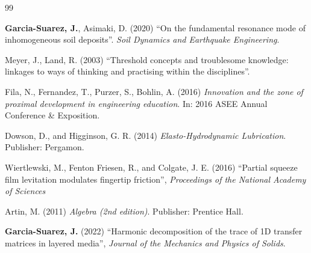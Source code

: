 \documentclass[11pt]{amsart}
\begin{document}
\begingroup
\renewcommand{\section}[2]{}%
\begin{thebibliography}{99}

	\newblock \textbf{Garcia-Suarez, J.}, Asimaki, D. (2020)
	\newblock ``On the fundamental resonance mode of inhomogeneous soil deposits''.
	\newblock \emph{Soil Dynamics and Earthquake Engineering}. 


    \newblock Meyer, J., Land, R. (2003)
    \newblock ``Threshold concepts and troublesome knowledge: linkages to ways of thinking and practising within the disciplines''.

    \newblock Fila, N., Fernandez, T., Purzer, S., Bohlin, A. (2016)
    \newblock \emph{Innovation and the zone of proximal development in engineering education}.
    \newblock In: 2016 ASEE Annual Conference \& Exposition.

    \newblock Dowson, D., and Higginson, G. R. (2014)
    \newblock \textit{Elasto-Hydrodynamic Lubrication}. 
    \newblock Publisher: Pergamon. 

    \newblock Wiertlewski, M., Fenton Friesen, R., and Colgate, J. E. (2016)
    \newblock ``Partial squeeze film levitation modulates fingertip friction'',
    \newblock \textit{Proceedings of the National Academy of Sciences}

	\newblock Artin, M. (2011)
	\newblock \emph{Algebra (2nd edition)}.
	\newblock Publisher: Prentice Hall.
		
    \newblock \textbf{Garcia-Suarez, J.} (2022)
    \newblock ``Harmonic decomposition of the trace of 1D transfer matrices in layered media'', 
    \newblock \emph{Journal of the Mechanics and Physics of Solids}.


    

\end{thebibliography}
\end{document}
